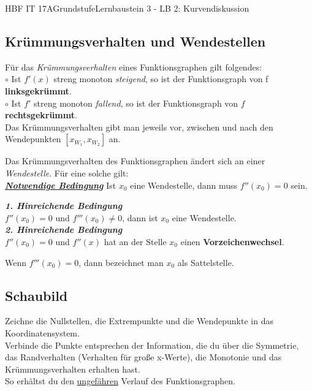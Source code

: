 \documentclass[11pt,twocolumn,oneside,openany,headings=optiontotoc,11pt,numbers=noenddot]{article}
\begin{document}
\begin{worksheet}{HBF IT 17A}{Grundstufe}{Lernbaustein 3 - LB 2: Kurvendiskussion}
		\subsection{Krümmungsverhalten und Wendestellen}
		Für das \textit{Krümmungsverhalten} eines Funktionsgraphen gilt folgendes:\\
		\(\circ\) Ist \(f'(x)\) streng monoton \textit{steigend}, so ist der Funktionsgraph von f \textbf{linksgekrümmt}.\\
		\(\circ\) Ist \(f'\) streng monoton \textit{fallend}, so ist der Funktionsgraph von \(f\) \textbf{rechtsgekrümmt}.\\
		\small{Das Krümmungsverhalten gibt man jeweils vor, zwischen und nach den Wendepunkten \([x_{W_1}, x_{W_2}]\) an.}\normalsize
		\par\noindent
		Das Krümmungsverhalten des Funktionsgraphen ändert sich an einer \textit{Wendestelle}. Für eine solche gilt:\\
		\textit{\underline{\textbf{Notwendige Bedingung}}} Ist \(x_0\) eine Wendestelle, dann muss \(f''(x_0)  = 0\) sein.\\
		\par\noindent
		\textbf{\textit{1. Hinreichende Bedingung}}\\
		\(f''(x_0)=0\) und \(f'''(x_0) \neq 0\), dann ist \(x_0\) eine Wendestelle.\\
		\textbf{\textit{2. Hinreichende Bedingung}}\\\(f''(x_0)=0\) und \(f''(x)\) hat an der Stelle \(x_0\) einen \textbf{Vorzeichenwechsel}.\\
		\par\noindent
		Wenn \(f'''(x_0)= 0\), dann bezeichnet man \(x_0\) als Sattelstelle.\\
		\subsection{Schaubild} Zeichne die Nullstellen, die Extrempunkte und die Wendepunkte in das Koordinatensystem.\\
		Verbinde die Punkte entsprechen der Information, die du über die Symmetrie, das Randverhalten (Verhalten für große x-Werte), die Monotonie und das Krümmungsverhalten erhalten hast.\\
		So erhältst du den \underline{ungefähren} Verlauf des Funktionsgraphen.\\
		\\

\end{worksheet}
\end{document}
